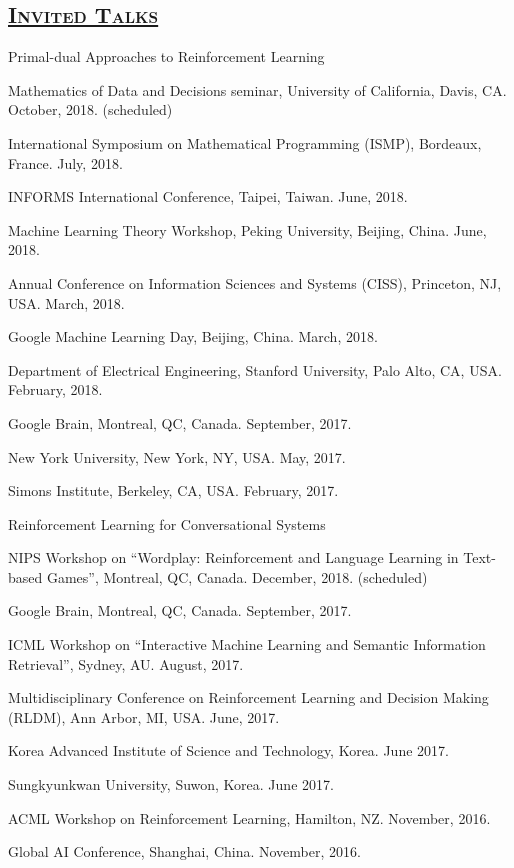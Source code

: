 \documentclass[10pt,twoside,letterpaper]{article}
\begin{document}
\subsection*{\textsc{\underline{Invited Talks}}}

\begin{compactitem}

\item{Primal-dual Approaches to Reinforcement Learning}
\begin{compactitem}
\item{Mathematics of Data and Decisions seminar, University of California, Davis, CA.  October, 2018. (scheduled)}
\item{International Symposium on Mathematical Programming (ISMP), Bordeaux, France. July, 2018.}
\item{INFORMS International Conference, Taipei, Taiwan. June, 2018.}
\item{Machine Learning Theory Workshop, Peking University, Beijing, China.  June, 2018.}
\item{Annual Conference on Information Sciences and Systems (CISS), Princeton, NJ, USA. March, 2018.}
\item{Google Machine Learning Day, Beijing, China. March, 2018.}
\item{Department of Electrical Engineering, Stanford University, Palo Alto, CA, USA. February, 2018.}
\item{Google Brain, Montreal, QC, Canada.  September, 2017.}
\item{New York University, New York, NY, USA.  May, 2017.}
\item{Simons Institute, Berkeley, CA, USA.  February, 2017.}
\end{compactitem}

\item{Reinforcement Learning for Conversational Systems}
\begin{compactitem}
\item{NIPS Workshop on ``Wordplay: Reinforcement and Language Learning in Text-based Games'', Montreal, QC, Canada.  December, 2018. (scheduled)}
\item{Google Brain, Montreal, QC, Canada.  September, 2017.}
\item{ICML Workshop on ``Interactive Machine Learning and Semantic Information Retrieval'', Sydney, AU.  August, 2017.}
\item{Multidisciplinary Conference on Reinforcement Learning and Decision Making (RLDM), Ann Arbor, MI, USA.  June, 2017.}
\item{Korea Advanced Institute of Science and Technology, Korea. June 2017.}
\item{Sungkyunkwan University, Suwon, Korea. June 2017.}
\item{ACML Workshop on Reinforcement Learning, Hamilton, NZ.  November, 2016.}
\item{Global AI Conference, Shanghai, China.  November, 2016.}
\end{compactitem}


\end{compactitem}
\end{document}
